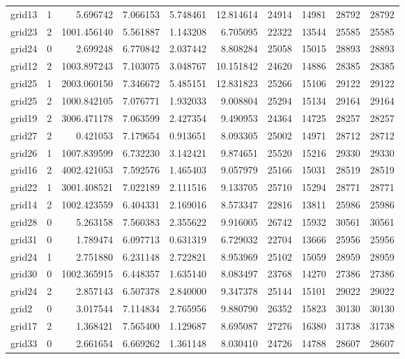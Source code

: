 \begin{longtable}{|l|r|r|r|r|r|r|r|r|r|}
grid13 & 1 & 5.696742 & 7.066153 & 5.748461 & 12.814614 & 24914 & 14981 & 28792 & 28792 \\
grid23 & 2 & 1001.456140 & 5.561887 & 1.143208 & 6.705095 & 22322 & 13544 & 25585 & 25585 \\
grid24 & 0 & 2.699248 & 6.770842 & 2.037442 & 8.808284 & 25058 & 15015 & 28893 & 28893 \\
grid12 & 2 & 1003.897243 & 7.103075 & 3.048767 & 10.151842 & 24620 & 14886 & 28385 & 28385 \\
grid25 & 1 & 2003.060150 & 7.346672 & 5.485151 & 12.831823 & 25266 & 15106 & 29122 & 29122 \\
grid25 & 2 & 1000.842105 & 7.076771 & 1.932033 & 9.008804 & 25294 & 15134 & 29164 & 29164 \\
grid19 & 2 & 3006.471178 & 7.063599 & 2.427354 & 9.490953 & 24364 & 14725 & 28257 & 28257 \\
grid27 & 2 & 0.421053 & 7.179654 & 0.913651 & 8.093305 & 25002 & 14971 & 28712 & 28712 \\
grid26 & 1 & 1007.839599 & 6.732230 & 3.142421 & 9.874651 & 25520 & 15216 & 29330 & 29330 \\
grid16 & 2 & 4002.421053 & 7.592576 & 1.465403 & 9.057979 & 25166 & 15031 & 28519 & 28519 \\
grid22 & 1 & 3001.408521 & 7.022189 & 2.111516 & 9.133705 & 25710 & 15294 & 28771 & 28771 \\
grid14 & 2 & 1002.423559 & 6.404331 & 2.169016 & 8.573347 & 22816 & 13811 & 25986 & 25986 \\
grid28 & 0 & 5.263158 & 7.560383 & 2.355622 & 9.916005 & 26742 & 15932 & 30561 & 30561 \\
grid31 & 0 & 1.789474 & 6.097713 & 0.631319 & 6.729032 & 22704 & 13666 & 25956 & 25956 \\
grid24 & 1 & 2.751880 & 6.231148 & 2.722821 & 8.953969 & 25102 & 15059 & 28959 & 28959 \\
grid30 & 0 & 1002.365915 & 6.448357 & 1.635140 & 8.083497 & 23768 & 14270 & 27386 & 27386 \\
grid24 & 2 & 2.857143 & 6.507378 & 2.840000 & 9.347378 & 25144 & 15101 & 29022 & 29022 \\
grid2 & 0 & 3.017544 & 7.114834 & 2.765956 & 9.880790 & 26352 & 15823 & 30130 & 30130 \\
grid17 & 2 & 1.368421 & 7.565400 & 1.129687 & 8.695087 & 27276 & 16380 & 31738 & 31738 \\
grid33 & 0 & 2.661654 & 6.669262 & 1.361148 & 8.030410 & 24726 & 14788 & 28607 & 28607 \\

\end{longtable}

